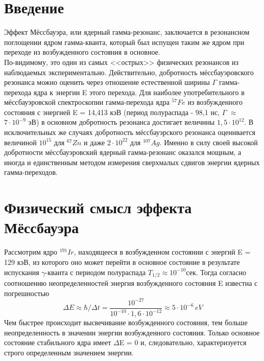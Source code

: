 \documentclass{article}
\begin{document}
\section{Введение}
\hspace{12pt} Эффект Мёссбауэра, или ядерный гамма-резонанс, заключается в резонансном поглощении ядром гамма-кванта, который был испущен таким же ядром при переходе из возбужденного состояния в основное.
\\
\indent По-видимому, это один из самых <<острых>> физических резонансов из наблюдаемых экспериментально. Действительно, добротность мёссбауэровского резонанса можно оценить через отношение естественной ширины $\Gamma$ 
гамма-перехода ядра к энергии E этого перехода. Для наиболее употребительного в мёссбауэровской спектроскопии гамма-перехода ядра $^{57}Fe$ из возбужденного состояния с энергией E = 14,413 кэВ (период полураспада - 98,1 нс, $\Gamma$ $\approx$ $7\cdot 10^{-9}$ эВ) в основном добротность резонанса достигает величины $1,5\cdot 10^{12}$. В исключительных же случаях добротность мёссбауэрского резонанса оценивается величиной $10^{15}$ для $^{67}Zn$ и даже  $2\cdot 10^{22}$ для $^{107}Ag$. Именно в силу своей высокой добротности мёссбауэровский ядерный гамма-резонанс оказался мощным, а иногда и единственным методом измерения сверхмалых сдвигов энергии ядерных гамма-переходов.

\section{Физический смысл эффекта Мёссбауэра}
\hspace{12pt} Рассмотрим ядро $^{191}Ir$, находящееся в возбужденном состоянии с энергий E = 129 кэВ, из которого оно может перейти в основное состояние в результате испускания $\gamma$-кванта с периодом полураспада $T_{1/2} \approx 10^{-10}$сек. Тогда согласно соотношению неопределенностей энергия возбужденного состояния E известна с погрешностью $${\Delta}E \approx {\hbar}/{\Delta}t = \frac{10^{-27}}{10^{-10}\cdot 1,6 \cdot 10^{-12}} \approx 5 \cdot 10^{-6} \hspace{2pt}eV$$
\hspace{12pt}Чем быстрее происходит высвечивание возбужденного состояния, тем больше неопределенность в значении энергии возбужденного состояния. Только основное состояние стабильного ядра имеет $\Delta$E = 0 и, следовательно, характеризуется строго определенным значением энергии.
\end{document}
